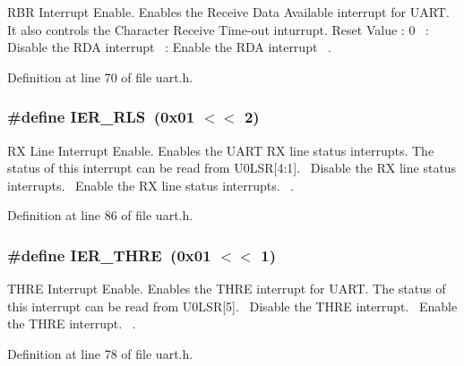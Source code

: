 R\+BR Interrupt Enable. Enables the Receive Data Available interrupt for U\+A\+RT. It also controls the Character Receive Time-\/out inturrupt. Reset Value \+: 0~ \+: Disable the R\+DA interrupt~ \+: Enable the R\+DA interrupt~\newline
. 



Definition at line 70 of file uart.\+h.

\subsubsection[{\texorpdfstring{I\+E\+R\+\_\+\+R\+LS}{IER_RLS}}]{\setlength{\rightskip}{0pt plus 5cm}\#define I\+E\+R\+\_\+\+R\+LS~(0x01 $<$$<$ 2)}\hypertarget{group___r_e_g_i_s_t_r_o___i_e_r_gaec947c63128590c8f615862ee9c2c953}{}\label{group___r_e_g_i_s_t_r_o___i_e_r_gaec947c63128590c8f615862ee9c2c953}


RX Line Interrupt Enable. Enables the U\+A\+RT RX line status interrupts. The status of this interrupt can be read from U0\+L\+SR\mbox{[}4\+:1\mbox{]}.~ Disable the RX line status interrupts.~ Enable the RX line status interrupts.~\newline
. 



Definition at line 86 of file uart.\+h.

\subsubsection[{\texorpdfstring{I\+E\+R\+\_\+\+T\+H\+RE}{IER_THRE}}]{\setlength{\rightskip}{0pt plus 5cm}\#define I\+E\+R\+\_\+\+T\+H\+RE~(0x01 $<$$<$ 1)}\hypertarget{group___r_e_g_i_s_t_r_o___i_e_r_ga22682c3d4571d7a79ed0ca2bc88a15a6}{}\label{group___r_e_g_i_s_t_r_o___i_e_r_ga22682c3d4571d7a79ed0ca2bc88a15a6}


T\+H\+RE Interrupt Enable. Enables the T\+H\+RE interrupt for U\+A\+RT. The status of this interrupt can be read from U0\+L\+SR\mbox{[}5\mbox{]}.~ Disable the T\+H\+RE interrupt.~ Enable the T\+H\+RE interrupt.~\newline
. 



Definition at line 78 of file uart.\+h.

